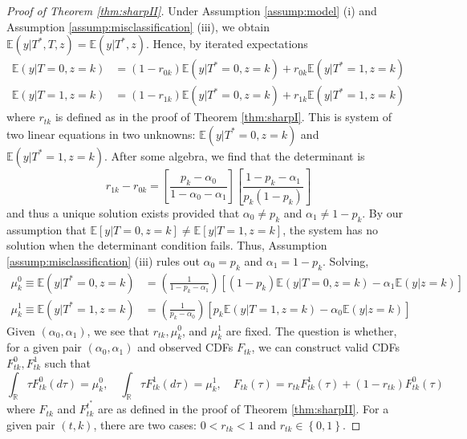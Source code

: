 
\begin{proof}[Proof of Theorem \ref{thm:sharpII}]
Under Assumption \ref{assump:model} (i) and Assumption \ref{assump:misclassification} (iii), we obtain $\mathbb{E}(y|T^*,T,z) = \mathbb{E}(y|T^*,z)$.
Hence, by iterated expectations
  \begin{align*}
    \mathbb{E}(y|T=0,z=k) &= (1 - r_{0k}) \mathbb{E}(y|T^*=0,z=k) + r_{0k}\mathbb{E}(y|T^*=1,z=k)\\
    \mathbb{E}(y|T=1,z=k) &= (1 - r_{1k}) \mathbb{E}(y|T^*=0,z=k) + r_{1k}\mathbb{E}(y|T^*=1,z=k)
  \end{align*}
where $r_{tk}$ is defined as in the proof of Theorem \ref{thm:sharpI}.
This is system of two linear equations in two unknowns: $\mathbb{E}(y|T^*=0,z=k)$ and $\mathbb{E}(y|T^*=1,z=k)$.
After some algebra, we find that the determinant is
\[
  r_{1k} - r_{0k} = \left[ \frac{p_k - \alpha_0}{1 - \alpha_0 - \alpha_1} \right]\left[ \frac{1 - p_k - \alpha_1}{p_k(1 - p_k)} \right] 
\]
and thus a unique solution exists provided that $\alpha_0 \neq p_k$ and $\alpha_1 \neq 1 - p_k$.
By our assumption that $\mathbb{E}[y|T=0,z=k] \neq \mathbb{E}[y|T=1,z=k]$, the system has no solution when the determinant condition fails.
Thus, Assumption \ref{assump:misclassification} (iii) rules out $\alpha_0 = p_k$ and $\alpha_1 = 1-p_k$.
Solving,
\begin{align*}
  \mu^0_{k} \equiv \mathbb{E}(y|T^*=0,z=k) &= \left(\frac{1}{1 - p_k - \alpha_1}\right)\left[ (1 - p_k)\mathbb{E}(y|T=0,z=k) - \alpha_1 \mathbb{E}(y|z=k) \right]\\
  \mu^1_{k} \equiv \mathbb{E}(y|T^*=1,z=k) &= \left(\frac{1}{p_k - \alpha_0}\right)\left[ p_k\mathbb{E}(y|T=1,z=k) - \alpha_0 \mathbb{E}(y|z=k) \right]
\end{align*}
Given $(\alpha_0, \alpha_1)$, we see that $r_{tk}, \mu^0_k$, and $\mu^1_{k}$ are fixed.
The question is whether, for a given pair $(\alpha_0, \alpha_1)$ and observed CDFs $F_{tk}$, we can construct valid CDFs $F_{tk}^0, F_{tk}^1$ such that 
\[
  \int_{\mathbb{R}} \tau F_{tk}^0(d\tau) = \mu_k^0, \quad
  \int_{\mathbb{R}} \tau F_{tk}^1(d\tau) = \mu_k^1, \quad 
  F_{tk}(\tau) = r_{tk} F^1_{tk}(\tau) + (1 - r_{tk}) F^0_{tk}(\tau)
\]
where $F_{tk}$ and $F^{t^*}_{tk}$ are as defined in the proof of Theorem \ref{thm:sharpII}.
For a given pair $(t,k)$, there are two cases: $0 < r_{tk} < 1$ and $r_{tk} \in \left\{ 0, 1 \right\}$.



\end{proof}
